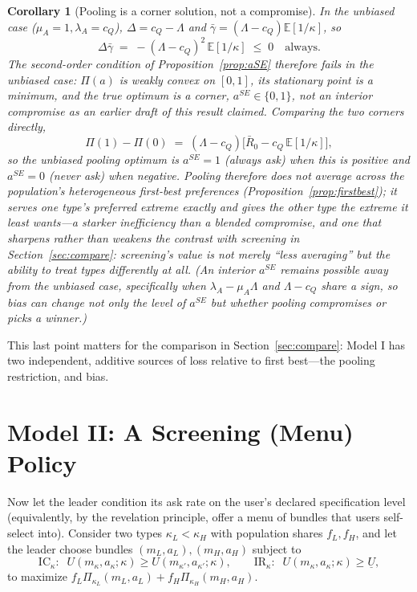 \documentclass[11pt]{article}
\newtheorem{corollary}{Corollary}
\begin{document}
\begin{corollary}[Pooling is a corner solution, not a compromise]\label{cor:corner}
In the unbiased case ($\mu_A=1,\lambda_A=c_Q$), $\Delta=c_Q-\Lambda$ and
$\bar\gamma=(\Lambda-c_Q)\mathbb{E}[1/\kappa]$, so
\[
\Delta\bar\gamma \;=\; -(\Lambda-c_Q)^2\,\mathbb{E}[1/\kappa] \;\le\; 0 \quad
\text{always}.
\]
The second-order condition of Proposition~\ref{prop:aSE} therefore \emph{fails}
in the unbiased case: $\Pi(a)$ is weakly convex on $[0,1]$, its stationary point
is a minimum, and the true optimum is a corner, $a^{SE}\in\{0,1\}$, not an
interior compromise as an earlier draft of this result claimed. Comparing the
two corners directly,
\[
\Pi(1)-\Pi(0) \;=\; (\Lambda-c_Q)\Big[\bar R_0 - c_Q\,\mathbb{E}[1/\kappa]\Big],
\]
so the unbiased pooling optimum is $a^{SE}=1$ (always ask) when this is positive
and $a^{SE}=0$ (never ask) when negative. Pooling therefore does not average
across the population's heterogeneous first-best preferences
(Proposition~\ref{prop:firstbest}); it serves one type's preferred extreme
exactly and gives the other type the extreme it least wants---a starker
inefficiency than a blended compromise, and one that sharpens rather than
weakens the contrast with screening in Section~\ref{sec:compare}: screening's
value is not merely ``less averaging'' but the ability to treat types
differently at all. (An interior $a^{SE}$ remains possible away from the
unbiased case, specifically when $\lambda_A-\mu_A\Lambda$ and $\Lambda-c_Q$
share a sign, so bias can change not only the level of $a^{SE}$ but whether
pooling compromises or picks a winner.)
\end{corollary}

This last point matters for the comparison in Section~\ref{sec:compare}: Model I
has two independent, additive sources of loss relative to first best---the
pooling restriction, and bias.

\section{Model II: A Screening (Menu) Policy}
\label{sec:model2}

Now let the leader condition its ask rate on the user's declared specification
level (equivalently, by the revelation principle, offer a menu of bundles that
users self-select into). Consider two types $\kappa_L<\kappa_H$ with population
shares $f_L,f_H$, and let the leader choose bundles $(m_L,a_L),(m_H,a_H)$ subject
to
\[
\text{IC}_\kappa:\;\; U(m_\kappa,a_\kappa;\kappa) \ge U(m_{\kappa'},a_{\kappa'};\kappa), \qquad
\text{IR}_\kappa:\;\; U(m_\kappa,a_\kappa;\kappa) \ge \underline{U},
\]
to maximize $f_L\Pi_{\kappa_L}(m_L,a_L)+f_H\Pi_{\kappa_H}(m_H,a_H)$.
\end{document}
